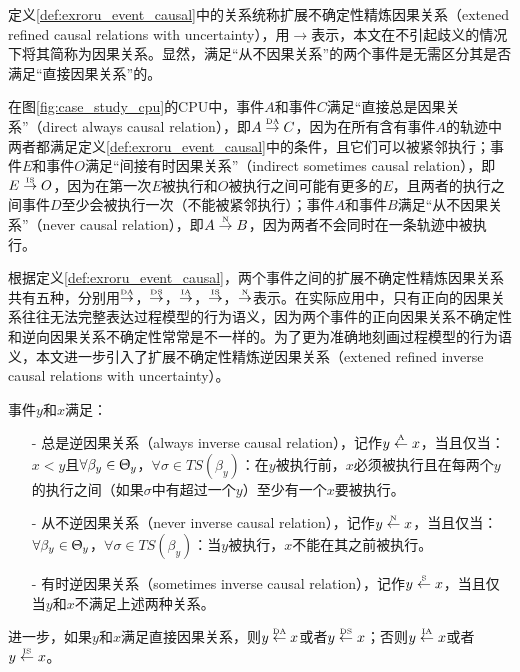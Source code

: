 定义\ref{def:exroru_event_causal}中的关系统称扩展不确定性精炼因果关系（extened refined causal relations with uncertainty），用$\rightarrow$表示，本文在不引起歧义的情况下将其简称为因果关系。显然，满足“从不因果关系”的两个事件是无需区分其是否满足“直接因果关系”的。

\begin{example}\label{ex:exroru_event_causal}
在图\ref{fig:case_study_cpu}的CPU中，事件$A$和事件$C$满足“直接总是因果关系”（direct always causal relation），即$A\overset{\text{\tiny{DA}}}{\rightarrow}C$，因为在所有含有事件$A$的轨迹中两者都满足定义\ref{def:exroru_event_causal}中的条件，且它们可以被紧邻执行；事件$E$和事件$O$满足“间接有时因果关系”（indirect sometimes causal relation），即$E\overset{\text{\tiny{IS}}}{\rightarrow}O$，因为在第一次$E$被执行和$O$被执行之间可能有更多的$E$，且两者的执行之间事件$D$至少会被执行一次（不能被紧邻执行）；事件$A$和事件$B$满足“从不因果关系”（never causal relation），即$A\overset{\text{\tiny{N}}}{\rightarrow}B$，因为两者不会同时在一条轨迹中被执行。
\end{example}

根据定义\ref{def:exroru_event_causal}，两个事件之间的扩展不确定性精炼因果关系共有五种，分别用$\overset{\text{\tiny{DA}}}{\rightarrow}$，$\overset{\text{\tiny{DS}}}{\rightarrow}$，$\overset{\text{\tiny{IA}}}{\rightarrow}$，$\overset{\text{\tiny{IS}}}{\rightarrow}$，$\overset{\text{\tiny{N}}}{\rightarrow}$表示。在实际应用中，只有正向的因果关系往往无法完整表达过程模型的行为语义，因为两个事件的正向因果关系不确定性和逆向因果关系不确定性常常是不一样的。为了更为准确地刻画过程模型的行为语义，本文进一步引入了扩展不确定性精炼逆因果关系（extened refined inverse causal relations with uncertainty）。

\begin{definition}[事件间扩展不确定性精炼逆因果关系]\label{def:exroru_event_inverse_causal}
事件$y$和$x$满足：
  \begin{itemize}
  	\item[-] 总是逆因果关系（always inverse causal relation），记作$y\overset{\text{\tiny{A}}}{\leftarrow}x$，当且仅当：$x<y$且$\forall\beta_{y}\in\Uptheta_{y}$，$\forall\sigma\in TS(\beta_{y})$：在$y$被执行前，$x$必须被执行且在每两个$y$的执行之间（如果$\sigma$中有超过一个$y$）至少有一个$x$要被执行。
  	\item[-] 从不逆因果关系（never inverse causal relation），记作$y\overset{\text{\tiny{N}}}{\leftarrow}x$，当且仅当：$\forall\beta_{y}\in\Uptheta_{y}$，$\forall\sigma\in TS(\beta_{y})$：当$y$被执行，$x$不能在其之前被执行。
  	\item[-] 有时逆因果关系（sometimes inverse causal relation），记作$y\overset{\text{\tiny{S}}}{\leftarrow}x$，当且仅当$y$和$x$不满足上述两种关系。
  \end{itemize}
进一步，如果$y$和$x$满足直接因果关系，则$y\overset{\text{\tiny{DA}}}{\leftarrow}x$或者$y\overset{\text{\tiny{DS}}}{\leftarrow}x$；否则$y\overset{\text{\tiny{IA}}}{\leftarrow}x$或者$y\overset{\text{\tiny{IS}}}{\leftarrow}x$。
\end{definition}


